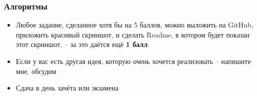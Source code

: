 \documentclass{beamer}
\begin{document}
\begin{frame}[fragile]
\frametitle{Алгоритмы}
\begin{itemize}
\item Любое задание, сделанное хотя бы на 5 баллов, можно выложить на GitHub, приложить красивый скриншот, и сделать Readme, в котором будет показан этот скриншот, -- за это даётся ещё \textbf{1 балл}
\pause
\item Если у вас есть другая идея, которую очень хочется реализовать -- напишите мне, обсудим
\pause
\item Сдача в день зачёта или экзамена
\end{itemize}
\end{frame}
\end{document}
